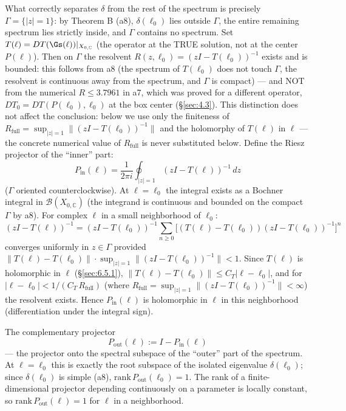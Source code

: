 What correctly separates $\delta$ from the rest of the spectrum is precisely
$\Gamma=\{|z|=1\}$: by Theorem B (a8), $\delta(\ell_0)$ lies outside
$\Gamma$, the entire remaining spectrum lies strictly inside, and $\Gamma$
contains no spectrum. Set $T(\ell)=DT(\Gs(\ell))|_{X_{0,\mathbb C}}$
(the operator at the TRUE solution, not at the center $P(\ell)$). Then on
$\Gamma$ the resolvent $R(z,\ell_0)=(zI-T(\ell_0))^{-1}$ exists and is
bounded: this follows from a8 (the spectrum of $T(\ell_0)$ does not touch
$\Gamma$, the resolvent is continuous away from the spectrum, and $\Gamma$ is
compact) --- and NOT from the numerical $R\le3.7961$ in a7, which was proved
for a different operator, $DT_0=DT(P(\ell_0),\ell_0)$ at the box center
(\S\ref{sec:4.3}). This distinction does not affect the conclusion: below we use only
the finiteness of $R_{\mathrm{full}}=\sup_{|z|=1}\|(zI-T(\ell_0))^{-1}\|$ and
the holomorphy of $T(\ell)$ in $\ell$ --- the concrete numerical value of
$R_{\mathrm{full}}$ is never substituted below. Define the Riesz projector
of the ``inner'' part:
\[
P_{\mathrm{in}}(\ell)=\frac1{2\pi i}\oint_{|z|=1}(zI-T(\ell))^{-1}\,dz
\]
($\Gamma$ oriented counterclockwise). At $\ell=\ell_0$ the integral exists as
a Bochner integral in $\mathcal B(X_{0,\mathbb C})$ (the integrand is
continuous and bounded on the compact $\Gamma$ by a8). For complex $\ell$ in
a small neighborhood of $\ell_0$:
\[
(zI-T(\ell))^{-1}=(zI-T(\ell_0))^{-1}\sum_{n\ge0}\bigl[(T(\ell)-T(\ell_0))(zI-T(\ell_0))^{-1}\bigr]^n
\]
converges uniformly in $z\in\Gamma$ provided
$\|T(\ell)-T(\ell_0)\|\cdot\sup_{|z|=1}\|(zI-T(\ell_0))^{-1}\|<1$. Since
$T(\ell)$ is holomorphic in $\ell$ (\S\ref{sec:6.5.1}), $\|T(\ell)-T(\ell_0)\|\le
C_T|\ell-\ell_0|$, and for $|\ell-\ell_0|<1/(C_T\,R_{\mathrm{full}})$ (where
$R_{\mathrm{full}}=\sup_{|z|=1}\|(zI-T(\ell_0))^{-1}\|<\infty$) the resolvent
exists. Hence $P_{\mathrm{in}}(\ell)$ is holomorphic in $\ell$ in this
neighborhood (differentiation under the integral sign).

The complementary projector
\[
P_{\mathrm{out}}(\ell):=I-P_{\mathrm{in}}(\ell)
\]
--- the projector onto the spectral subspace of the ``outer'' part of the
spectrum. At $\ell=\ell_0$ this is exactly the root subspace of the isolated
eigenvalue $\delta(\ell_0)$; since $\delta(\ell_0)$ is simple (a8),
$\mathrm{rank}\,P_{\mathrm{out}}(\ell_0)=1$. The rank of a finite-dimensional
projector depending continuously on a parameter is locally constant, so
$\mathrm{rank}\,P_{\mathrm{out}}(\ell)=1$ for $\ell$ in a neighborhood.

